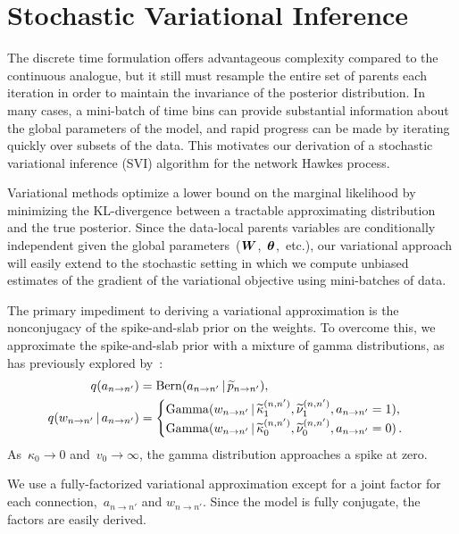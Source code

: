 \section{Stochastic Variational Inference}
The discrete time formulation offers advantageous complexity compared
to the continuous analogue, but it still must resample the entire set
of parents each iteration in order to maintain the invariance of the
posterior distribution. In many cases, a mini-batch of time bins can
provide substantial information about the global parameters of the
model, and rapid progress can be made by iterating quickly over
subsets of the data. This motivates our derivation of a stochastic
variational inference (SVI) algorithm for the network Hawkes process.

Variational methods optimize a lower bound on the marginal likelihood
by minimizing the KL-divergence between a tractable approximating
distribution and the true posterior. Since the data-local parents
variables are conditionally independent given the global
parameters~($\boldsymbol{W}$,~$\boldsymbol{\theta}$,~etc.), our variational approach will
easily extend to the stochastic setting in which we compute unbiased
estimates of the gradient of the variational objective using
mini-batches of data.

The primary impediment to deriving a variational approximation is the
nonconjugacy of the spike-and-slab prior on the weights.  To overcome
this, we approximate the spike-and-slab prior with a mixture of gamma
distributions, as has previously explored by~\citet{Grabska-2013}:
\begin{align*}
q(a_{n \to n'}) &= \mathrm{Bern}(a_{n \to n'} \,|\, \widetilde{p}_{n \to n'}), \\
q(w_{n \to n'} \,|\, a_{n \to n'}) &=
\begin{cases} 
\mathrm{Gamma}(w_{n \to n'} \,|\, \widetilde{\kappa}_1^{(n, n')}, \widetilde{\nu}_1^{(n,n')}, a_{n \to n'} =1), \\
\mathrm{Gamma}(w_{n \to n'} \,|\, \widetilde{\kappa}_0^{(n, n')}, \widetilde{\nu}_0^{(n, n')}, a_{n \to n'} =0)\,.
\end{cases}
\end{align*}
As~$\kappa_0 \to 0$ and~$v_0\to \infty$, the gamma distribution
approaches a spike at zero.

We use a fully-factorized variational approximation except for a joint
factor for each connection,~$a_{n\to n'}$ and $w_{n \to n'}$.  Since
the model is fully conjugate, the factors are easily derived.

